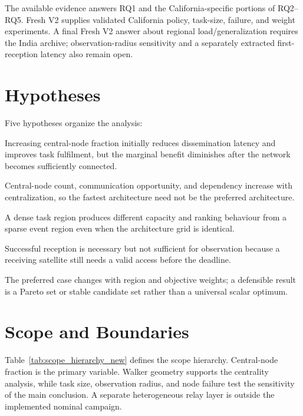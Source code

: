 The available evidence answers RQ1 and the California-specific portions of RQ2--RQ5. Fresh V2 supplies validated California policy, task-size, failure, and weight experiments. A final Fresh V2 answer about regional load/generalization requires the India archive; observation-radius sensitivity and a separately extracted first-reception latency also remain open.

\section{Hypotheses}

Five hypotheses organize the analysis:

\begin{description}[leftmargin=3.5cm,style=nextline]
\item[H1: Diminishing returns] Increasing central-node fraction initially reduces dissemination latency and improves task fulfilment, but the marginal benefit diminishes after the network becomes sufficiently connected.
\item[H2: Resource penalty] Central-node count, communication opportunity, and dependency increase with centralization, so the fastest architecture need not be the preferred architecture.
\item[H3: Load dependence] A dense task region produces different capacity and ranking behaviour from a sparse event region even when the architecture grid is identical.
\item[H4: Geometry dependence] Successful reception is necessary but not sufficient for observation because a receiving satellite still needs a valid access before the deadline.
\item[H5: No universal optimum] The preferred case changes with region and objective weights; a defensible result is a Pareto set or stable candidate set rather than a universal scalar optimum.
\end{description}

\section{Scope and Boundaries}

Table~\ref{tab:scope_hierarchy_new} defines the scope hierarchy. Central-node fraction is the primary variable. Walker geometry supports the centrality analysis, while task size, observation radius, and node failure test the sensitivity of the main conclusion. A separate heterogeneous relay layer is outside the implemented nominal campaign.

